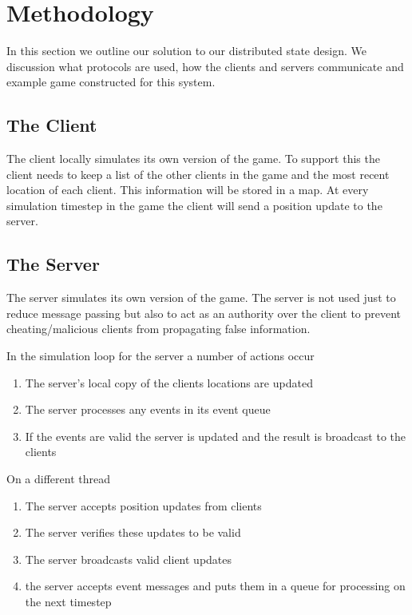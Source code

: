 
\section{Methodology}
\label{sec:methodology}

	In this section we outline our solution to our distributed state design. We discussion what protocols are used, how the clients and servers communicate and example game constructed for this system.
	
\subsection{The Client}

	The client locally simulates its own version of the game. To support this the client needs to keep a list of the other clients in the game and the most recent location of each client. This information will be stored in a map. At every simulation timestep in the game the client will send a position update to the server.
	
\subsection{The Server}

	The server simulates its own version of the game. The server is not used just to reduce message passing but also to act as an authority over the client to prevent cheating/malicious clients from propagating false information.
	
	In the simulation loop for the server a number of actions occur
	\begin{enumerate}[topsep=2pt,itemsep=-1ex,partopsep=1ex,parsep=1ex]
		\item The server's local copy of the clients locations are updated
		\item The server processes any events in its event queue
		\item If the events are valid the server is updated and the result is broadcast to the clients
	\end{enumerate}
	On a different thread
	\begin{enumerate}[topsep=2pt,itemsep=-1ex,partopsep=1ex,parsep=1ex]
		\item The server accepts position updates from clients
		\item The server verifies these updates to be valid
		\item The server broadcasts valid client updates
		\item the server accepts event messages and puts them in a queue for processing on the next timestep
	\end{enumerate}
	
